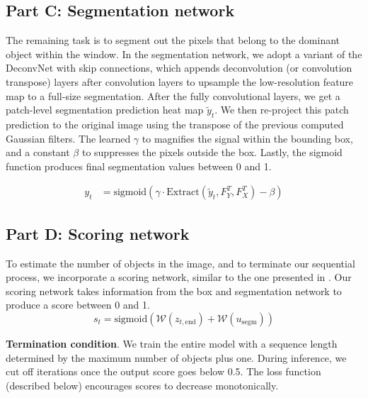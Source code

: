 \subsection{Part C: Segmentation network}

The remaining task is to segment out the pixels that belong to the dominant
object within the window. In the segmentation network, we adopt a variant of
the DeconvNet \cite{noh15deconv} with skip connections, which appends
deconvolution (or convolution transpose) layers after convolution layers to
upsample the low-resolution feature map to a full-size segmentation. After the
fully convolutional layers, we get a patch-level segmentation prediction heat
map $\tilde{y}_t$. We then re-project this patch prediction to the original
image using the transpose of the previous computed Gaussian filters. The
learned $\gamma$ to magnifies the signal within the bounding box, and a
constant $\beta$ to suppresses the pixels outside the box. Lastly, the sigmoid
function produces final segmentation values between 0 and 1.

\begin{align}
y_t &= \text{sigmoid} \left(
\gamma \cdot \text{Extract}(\tilde{y}_t, F_Y^T, F_X^T)
- \beta \right)
\end{align}

\subsection{Part D: Scoring network}

To estimate the number of objects in the image, and to terminate our sequential
process, we incorporate a scoring network, similar to the one presented in
\cite{romeraparedes15ris}. Our scoring network takes information from the box
and segmentation network to produce a score between 0 and 1.
\begin{equation}
s_{t} = \text{sigmoid}(\mathcal{W}(z_{t, \text{end}}) + \mathcal{W}(u_{\text{segm}}))
\end{equation}

\textbf{Termination condition}. We train the entire model with a sequence length
determined by the maximum number of objects plus one. During inference, we cut
off iterations once the output score goes below 0.5. The loss function
(described below) encourages scores to decrease monotonically.

